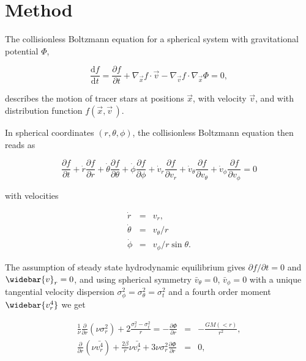 \section{Method}\label{sec:method}
The collisionless Boltzmann equation for a spherical system with
gravitational potential $\Phi$,

\begin{equation}
\frac{\text{d}f}{\text{d}t} = \frac{\partial f}{\partial t} + \nabla_{\vec{x}} f\cdot\vec{v} - \nabla_{\vec{v}} f\cdot\nabla_{\vec{x}}\Phi = 0,
\end{equation}

describes the motion of tracer stars at positions $\vec{x}$, with
velocity $\vec{v}$, and with distribution function
$f(\vec{x},\vec{v}\,)$.

In spherical coordinates $(r, \theta, \phi)$, the collisionless
Boltzmann equation then reads as

\begin{equation}
    \frac{\partial f}{\partial t} + \dot{r}\frac{\partial f}{\partial r} + \dot{\theta}\frac{\partial f}{\partial \theta} + \dot{\phi}\frac{\partial f}{\partial \phi} + \dot{v}_r\frac{\partial f}{\partial v_r}+\dot{v}_\theta\frac{\partial f}{\partial v_\theta} +\dot{v}_\phi\frac{\partial f}{\partial v_\phi} = 0
\end{equation}

with velocities

\begin{eqnarray}
\dot{r}       &=& v_r,\\
\dot{\theta}  &=& v_\theta/r\\
\dot{\phi}    &=& v_\phi / r \sin\theta.
\end{eqnarray}

The assumption of steady state hydrodynamic equilibrium gives
$\partial f/\partial t=0$ and $\widebar{v}_r=0$, and using spherical
symmetry $\bar{v}_\theta=0$, $\bar{v}_\phi=0$ with a unique tangential
velocity dispersion $\sigma_\phi^2=\sigma_\theta^2=\sigma_t^2$ and a
fourth order moment $\widebar{v_r^4}$ we get

\begin{eqnarray}\label{eq:Jeans}
    \frac{1}{\nu}\frac{\partial}{\partial r}(\nu\sigma_{r}^2) + 2\frac{\sigma_{r}^2-\sigma_{t}^2}{r} = -\frac{\partial \Phi}{\partial r} &=& -\frac{GM(<r)}{r^2},\\
    \frac{\partial}{\partial r}(\nu\bar{v_r^4})+\frac{2\beta}{r}\nu\bar{v_r^4}+3\nu\sigma_r^2\frac{\partial\Phi}{\partial r}&=&0,
\end{eqnarray}

